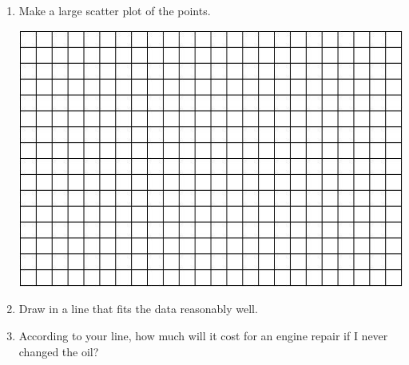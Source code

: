 \documentclass[12pt]{article}
\begin{document}
\begin{enumerate}
\begin{enumerate}
\item Make a large scatter plot of the points. 

\vspace{.1in}
\begin{center}
 {\includegraphics [width = 6in] {../GraphPaper}}
\end{center}
\vspace{.1in}

\item Draw in a line that fits the data reasonably well.
\item  According to your line, how much will it cost for an engine repair if I never changed the oil?
\end{enumerate}

\end{enumerate}
\end{document}
